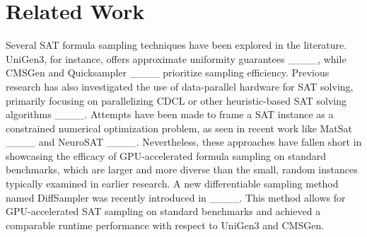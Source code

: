 \section{Related Work}
Several SAT formula sampling techniques have been explored in the literature. {\sc UniGen3}, for instance, offers approximate uniformity guarantees ____, while {\sc CMSGen} and {\sc Quicksampler} ____ prioritize sampling efficiency. Previous research has also investigated the use of data-parallel hardware for SAT solving, primarily focusing on parallelizing CDCL or other heuristic-based SAT solving algorithms ____. Attempts have been made to frame a SAT instance as a constrained numerical optimization problem, as seen in recent work like {\sc MatSat} ____ and {\sc NeuroSAT} ____. Nevertheless, these approaches have fallen short in showcasing the efficacy of GPU-accelerated formula sampling on standard benchmarks, which are larger and more diverse than the small, random instances typically examined in earlier research. A new differentiable sampling method named {\sc DiffSampler} was recently introduced in ____. This method allows for GPU-accelerated SAT sampling on standard benchmarks and achieved a comparable runtime performance with respect to {\sc UniGen3} and {\sc CMSGen}.